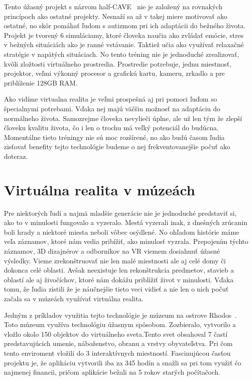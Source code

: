 \documentclass[10pt,twoside,slovak,a4paper]{article}
\begin{document}
Tento úžasný projekt s názvom half-CAVE~\cite{Autism} nie je založený na rovnakých princípoch ako ostatné projekty. Nesnaží sa až v takej miere motivovať ako ostatné, no skôr pomáhať ľudom s autizmom pri ich adaptácii do bežného života. Projekt je tvorený 6 simuláciamy, ktoré človeka naučia ako zvládať emócie, stres v bežných situáciách ako je ranné vstávanie. Taktiež učia ako využívať relaxačné stratégie v napätých situáciach. No tento tréning nie je jednoduché zrealizovať, kvôli zložtosti virtuálneho prostredia. Prostredie potrebuje, jednu miestnosť, projektor, veľmi výkonný procesor a grafickú kartu, kameru, zrkadlo a pre priblíženie 128GB RAM. 

Ako vidíme virtualna realita je veľmi prospešná aj pri pomoci ľuďom so špecialnymi potrebami. Vďaka nej majú väčšiu možnosť na adaptáciu do normálneho života. Samozrejme človeka nevylieči úplne, ale už len tým že zlepší človeku kvalitu života, čo i len o trochu má veľký potenciál do budúcna. Momentálne tieto tréningy nie sú moc rozšírené, no ako budú časom ľudia zisťovať benefity tejto technológie budeme o nej frekventovanejšie počuť ako doteraz.   

\section{Virtuálna realita v múzeách} \label{muzea}
Pre niektorých ľudí a najmä mladšie generácie nie je jednoduché predstaviť si, ako to v minulosti fungovalo a vyzeralo. Mestá vyzerali inak, z dnešných zrúcanin boli hrady a niektoré miesta neboli vôbec osýdlené. No ohľadom histórie máme veľa záznamov, ktoré nám vedia pribížiť, ako minulosť vyzrala. Prepojením týchto záznamov, 3D dizajnérov a odborníkov na VR viemem dosiahnuť úžasné výsledky. Vieme zrekonštruovať nie len malé miestnosti ale aj celé domy či dokonca celé oblasti. Avšak neexistuje len rekonštrukcia predmetov, stavieb a oblastí ale aj živočíchov, ktoré nám dokážu priblížiť život v minulosti. Vďaka tomu, že ľudia zistili že je náučnejšie tieto veci vidieť a nie len o nich počuť začala sa v múzeách využívať virtuálna realita.

Jedným z príkladov využitia tejto technológie je múzeum na ostrove Rhodos~\cite{Muzeum}. Toto múzeum využíva technológiu úžasnym spôsobom. Zozbieralo, vytvorilo a vložlo okolo 150 objektov do virtuálneho sveta.Tento svet obsahoval 7 častí predstavujúcich umenie, náboženstvo, obranu a vrstvy obyvateľstva. Pri čom tento enviroment vložili do 3 interaktívnych miestností. Fascinujúcou časťou projektu je, že aplikáciu vytvorili iba za 345 hodín a snažli sa pri tom využiť čo najmenej financii, pričom aplikácie bežali na 5 rokov starých počítačoch.
\end{document}
